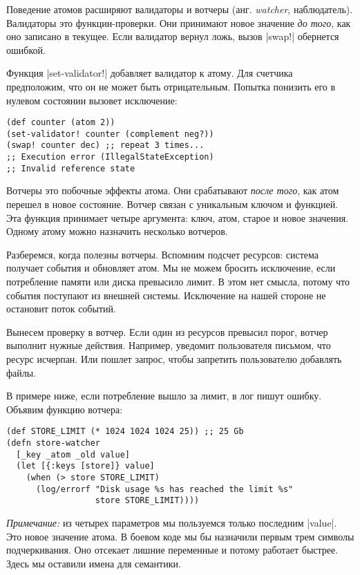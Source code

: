 Поведение атомов расширяют валидаторы и вотчеры (анг. \emph{watcher},
наблюдатель). Валидаторы это функции-проверки. Они принимают новое значение
\emph{до того}, как оно записано в текущее. Если валидатор вернул ложь, вызов
\spverb|swap!| обернется ошибкой.

Функция \spverb|set-validator!| добавляет валидатор к атому. Для счетчика
предположим, что он не может быть отрицательным. Попытка понизить его в нулевом
состоянии вызовет исключение:

\begin{verbatim}
(def counter (atom 2))
(set-validator! counter (complement neg?))
(swap! counter dec) ;; repeat 3 times...
;; Execution error (IllegalStateException)
;; Invalid reference state
\end{verbatim}

Вотчеры это побочные эффекты атома. Они срабатывают \emph{после того}, как атом
перешел в новое состояние. Вотчер связан с уникальным ключом и функцией. Эта
функция принимает четыре аргумента: ключ, атом, старое и новое значения. Одному
атому можно назначить несколько вотчеров.

Разберемся, когда полезны вотчеры. Вспомним подсчет ресурсов: система получает
события и обновляет атом. Мы не можем бросить исключение, если потребление
памяти или диска превысило лимит. В этом нет смысла, потому что события
поступают из внешней системы. Исключение на нашей стороне не остановит поток
событий.

Вынесем проверку в вотчер. Если один из ресурсов превысил порог, вотчер выполнит
нужные действия. Например, уведомит пользователя письмом, что ресурс
исчерпан. Или пошлет запрос, чтобы запретить пользователю добавлять файлы.

В примере ниже, если потребление вышло за лимит, в лог пишут ошибку. Объявим
функцию вотчера:

\begin{verbatim}
(def STORE_LIMIT (* 1024 1024 1024 25)) ;; 25 Gb
(defn store-watcher
  [_key _atom _old value]
  (let [{:keys [store]} value]
    (when (> store STORE_LIMIT)
      (log/errorf "Disk usage %s has reached the limit %s"
                  store STORE_LIMIT))))
\end{verbatim}

\emph{Примечание:} из четырех параметров мы пользуемся только последним
\spverb|value|. Это новое значение атома. В боевом коде мы бы назначили первым
трем символы подчеркивания. Оно отсекает лишние переменные и потому работает
быстрее. Здесь мы оставили имена для семантики.

